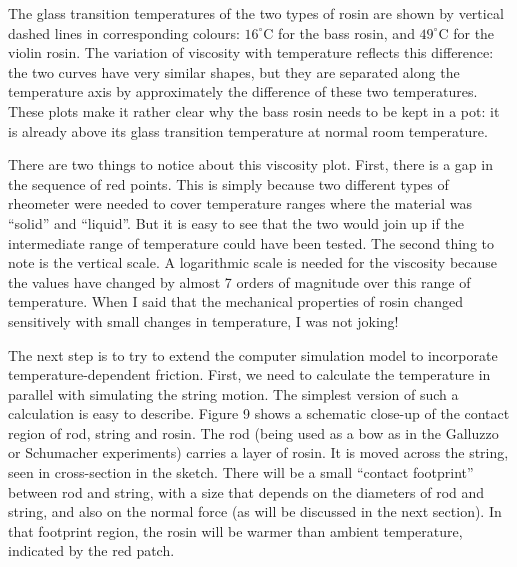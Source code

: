   The glass transition temperatures of the two types of rosin are shown by 
  vertical dashed lines in corresponding colours: $16^\circ$C for the bass 
  rosin, and $49^\circ$C for the violin rosin. The variation of viscosity with 
  temperature reflects this difference: the two curves have very similar 
  shapes, but they are separated along the temperature axis by approximately 
  the difference of these two temperatures. These plots make it rather clear 
  why the bass rosin needs to be kept in a pot: it is already above its glass 
  transition temperature at normal room temperature. 

  There are two things to notice about this viscosity plot. First, there is a 
  gap in the sequence of red points. This is simply because two different types 
  of rheometer were needed to cover temperature ranges where the material was 
  “solid” and “liquid”. But it is easy to see that the two would join up if the 
  intermediate range of temperature could have been tested. The second thing to 
  note is the vertical scale. A logarithmic scale is needed for the viscosity 
  because the values have changed by almost 7 orders of magnitude over this 
  range of temperature. When I said that the mechanical properties of rosin 
  changed sensitively with small changes in temperature, I was not joking! 

  The next step is to try to extend the computer simulation model to 
  incorporate temperature-dependent friction. First, we need to calculate the 
  temperature in parallel with simulating the string motion. The simplest 
  version of such a calculation is easy to describe. Figure 9 shows a schematic 
  close-up of the contact region of rod, string and rosin. The rod (being used 
  as a bow as in the Galluzzo or Schumacher experiments) carries a layer of 
  rosin. It is moved across the string, seen in cross-section in the sketch. 
  There will be a small “contact footprint” between rod and string, with a size 
  that depends on the diameters of rod and string, and also on the normal force 
  (as will be discussed in the next section). In that footprint region, the 
  rosin will be warmer than ambient temperature, indicated by the red patch. 

